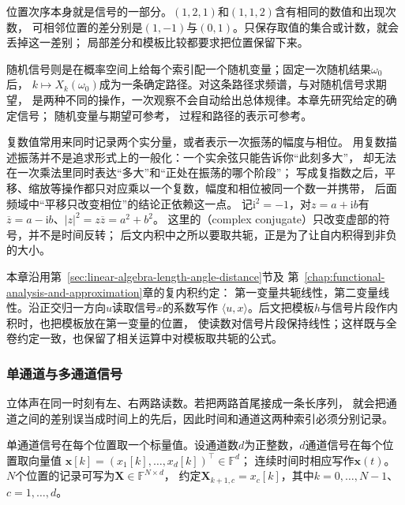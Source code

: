 位置次序本身就是信号的一部分。$(1,2,1)$和$(1,1,2)$含有相同的数值和出现次数，
可相邻位置的差分别是$(1,-1)$与$(0,1)$。只保存取值的集合或计数，就会丢掉这一差别；
局部差分和模板比较都要求把位置保留下来。

随机信号则是在概率空间上给每个索引配一个随机变量；固定一次随机结果$\omega_0$后，
$k\mapsto X_k(\omega_0)$成为一条确定路径。对这条路径求频谱，与对随机信号求期望，
是两种不同的操作，一次观察不会自动给出总体规律。本章先研究给定的确定信号；
随机变量与期望可参考，
过程和路径的表示可参考。

复数值常用来同时记录两个实分量，或者表示一次振荡的幅度与相位。
用复数描述振荡并不是追求形式上的一般化：一个实余弦只能告诉你“此刻多大”，
却无法在一次乘法里同时表达“多大”和“正处在振荡的哪个阶段”；
写成复指数之后，平移、缩放等操作都只对应乘以一个复数，幅度和相位被同一个数一并携带，
后面频域中“平移只改变相位”的结论正依赖这一点。
记$\mathrm i^2=-1$，对$z=a+\mathrm ib$有
$\overline z=a-\mathrm ib$、$|z|^2=z\overline z=a^2+b^2$。
这里的（complex conjugate）只改变虚部的符号，并不是时间反转；
后文内积中之所以要取共轭，正是为了让自内积得到非负的大小。

本章沿用第~\ref{sec:linear-algebra-length-angle-distance}节及
第~\ref{chap:functional-analysis-and-approximation}章的复内积约定：
第一变量共轭线性，第二变量线性。沿正交归一方向$u$读取信号$x$的系数写作
$\langle u,x\rangle$。后文把模板$h$与信号片段作内积时，也把模板放在第一变量的位置，
使读数对信号片段保持线性；这样既与全卷约定一致，也保留了相关运算中对模板取共轭的公式。

\subsubsection{单通道与多通道信号}

立体声在同一时刻有左、右两路读数。若把两路首尾接成一条长序列，
就会把通道之间的差别误当成时间上的先后，因此时间和通道这两种索引必须分别记录。
\begin{definition}[标量信号与向量值信号]
  \label{def:signal-multichannel}
  单通道信号在每个位置取一个标量值。设通道数$d$为正整数，$d$通道信号在每个位置取向量值
  $\bm x[k]=(x_1[k],\ldots,x_d[k])^\top\in\mathbb F^d$；
  连续时间时相应写作$\bm x(t)$。
  $N$个位置的记录可写为$\bm X\in\mathbb F^{N\times d}$，
  约定$\bm X_{k+1,c}=x_c[k]$，其中$k=0,\ldots,N-1$、$c=1,\ldots,d$。
\end{definition}

